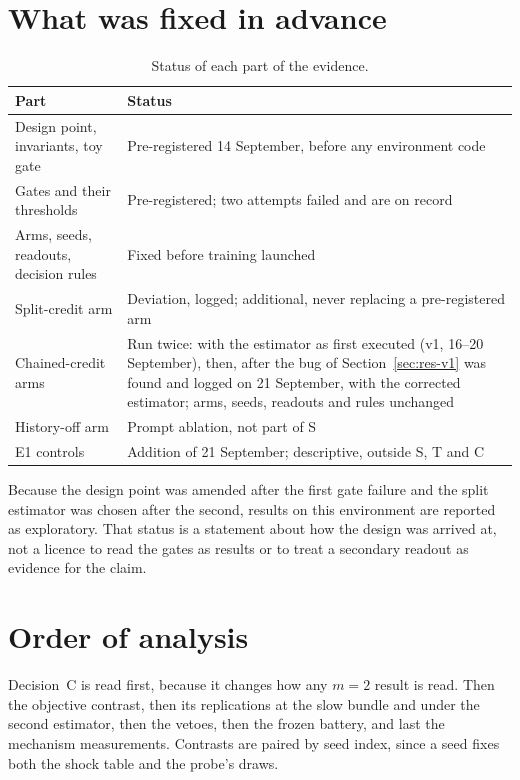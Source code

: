 \section{What was fixed in advance}
\label{sec:status}

\begin{table}[ht]
\centering\small
\caption{Status of each part of the evidence.}
\label{tab:evidence-status}
\begin{tabularx}{\textwidth}{>{\raggedright\arraybackslash}p{6.2cm}X}
\toprule
Part & Status \\
\midrule
Design point, invariants, toy gate & Pre-registered 14 September, before any environment code \\
Gates and their thresholds & Pre-registered; two attempts failed and are on record \\
Arms, seeds, readouts, decision rules & Fixed before training launched \\
Split-credit arm & Deviation, logged; additional, never replacing a pre-registered arm \\
Chained-credit arms & Run twice: with the estimator as first executed (v1, 16--20 September), then, after the bug of Section~\ref{sec:res-v1} was found and logged on 21 September, with the corrected estimator; arms, seeds, readouts and rules unchanged \\
History-off arm & Prompt ablation, not part of S \\
E1 controls & Addition of 21 September; descriptive, outside S, T and C \\
\bottomrule
\end{tabularx}
\end{table}

Because the design point was amended after the first gate failure and the
split estimator was chosen after the second, results on this environment are
reported as exploratory.
That status is a statement about how the design was arrived at, not a
licence to read the gates as results or to treat a secondary readout as
evidence for the claim.

\section{Order of analysis}
\label{sec:analysis-order}

Decision~C is read first, because it changes how any \(m=2\) result is read.
Then the objective contrast, then its replications at the slow bundle and
under the second estimator, then the vetoes, then the frozen battery, and
last the mechanism measurements.
Contrasts are paired by seed index, since a seed fixes both the shock table
and the probe's draws.

